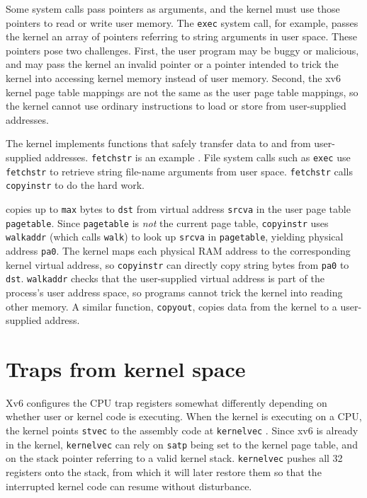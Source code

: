 Some system calls pass pointers as arguments, and the kernel must use
those pointers to read or write user memory. The {\tt exec} system
call, for example, passes the kernel an array of pointers
referring to string arguments in user space.
These pointers pose
two challenges. First, the user program may be buggy or malicious, and
may pass the kernel an invalid pointer or a pointer intended to trick
the kernel into accessing kernel memory instead of user memory.
Second, the xv6 kernel page table mappings are not the same as the
user page table mappings, so the kernel cannot use ordinary
instructions to load or store from user-supplied addresses.

The kernel implements functions that safely transfer data to and
from user-supplied addresses.
{\tt fetchstr} is an example .
File system calls such as
{\tt exec} use {\tt fetchstr} to retrieve string file-name arguments from user
space.
\lstinline{fetchstr} calls \lstinline{copyinstr}
to do the hard work.

 copies up to \lstinline{max} bytes to
\lstinline{dst} from virtual address \lstinline{srcva} in the user page
table \lstinline{pagetable}.
Since \lstinline{pagetable} is {\it not} the current page
table,
\lstinline{copyinstr} uses {\tt walkaddr}
(which calls {\tt walk}) to look up
\lstinline{srcva} in
\lstinline{pagetable}, yielding
physical address \lstinline{pa0}.
The kernel maps each physical RAM address to the corresponding
kernel virtual address, so
{\tt copyinstr} can directly copy string bytes from {\tt pa0} to {\tt dst}.
{\tt walkaddr} 
checks that the user-supplied virtual address is part of
the process's user address space, so programs
cannot trick the kernel into reading other memory.
A similar function, {\tt copyout}, copies data from the
kernel to a user-supplied address.

\section{Traps from kernel space}
\label{s:ktraps}

Xv6 configures the CPU trap registers somewhat differently depending
on whether user or kernel code is executing.
When the kernel is executing on a CPU, the kernel points {\tt stvec}
to the assembly code at {\tt kernelvec}
.
Since xv6 is already in the kernel, {\tt kernelvec} can rely
on {\tt satp} being set to the kernel page table, and on the
stack pointer referring to a valid kernel stack.
{\tt kernelvec} pushes all 32 registers onto the stack,
from which it will later restore them
so that the interrupted
kernel code can resume without disturbance.

